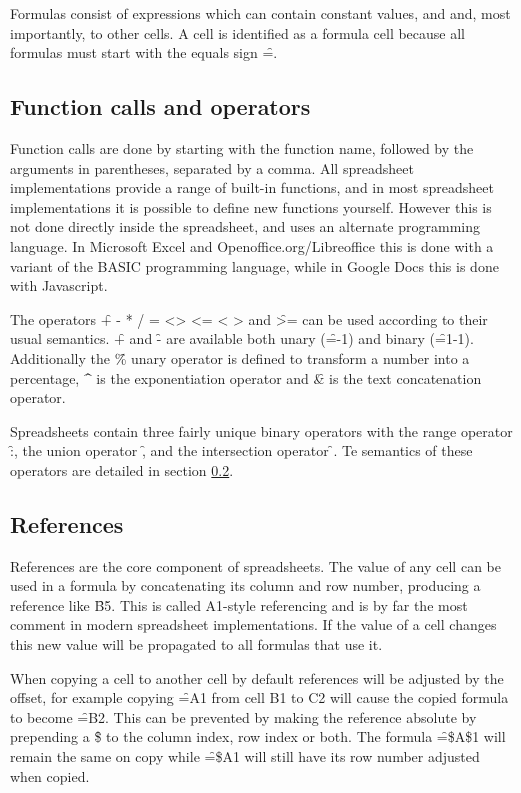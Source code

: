 Formulas consist of expressions which can contain constant values,  and  and, most importantly,  to other cells.
A cell is identified as a formula cell because all formulas must start with the equals sign \f{=}.

\subsection{Function calls and operators}

Function calls are done by starting with the function name, followed by the arguments in parentheses, separated by a comma.
All spreadsheet implementations provide a range of built-in functions, and in most spreadsheet implementations it is possible to define new functions yourself.
However this is not done directly inside the spreadsheet, and uses an alternate programming language.
In Microsoft Excel and Openoffice.org/Libreoffice this is done with a variant of the BASIC programming language, while in Google Docs this is done with Javascript.

The operators \f{+ - * / = <> <= < >} and \f{>=} can be used according to their usual semantics.
\f{+} and \f{-} are available both unary (\f{=-1}) and binary (\f{=1-1}).
Additionally the \f{\%} unary operator is defined to transform a number into a percentage, \f{\^} is the exponentiation operator and \f{\&} is the text concatenation operator.

Spreadsheets contain three fairly unique binary operators with the range operator \f{:}, the union operator \f{,} and the intersection operator \f{}.
Te semantics of these operators are detailed in section \ref{sec:references}.

\subsection{References}
\label{sec:references}
References are the core component of spreadsheets.
The value of any cell can be used in a formula by concatenating its column and row number, producing a reference like \f{B5}.
This is called A1-style referencing and is by far the most comment in modern spreadsheet implementations.
If the value of a cell changes this new value will be propagated to all formulas that use it.

When copying a cell to another cell by default references will be adjusted by the offset, for example copying \f{=A1} from cell B1 to C2 will cause the copied formula to become \f{=B2}.
This can be prevented by making the reference absolute by prepending a \f{\$} to the column index, row index or both.
The formula \f{=\$A\$1} will remain the same on copy while \f{=\$A1} will still have its row number adjusted when copied.

